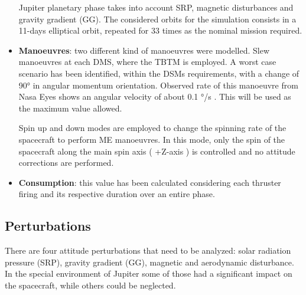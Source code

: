 \begin{itemize}
    Jupiter planetary phase takes into account SRP, magnetic disturbances and gravity gradient (GG). The considered orbits for the simulation consists in a 11-days elliptical orbit, repeated for 33 times as the nominal mission required. 

    \item \textbf{Manoeuvres}: two different kind of manoeuvres were modelled. Slew manoeuvres at each DMS, where the TBTM is employed. A worst case scenario has been identified, within the DSMs requirements, with a change of 90° in angular momentum orientation. Observed rate of this manoeuvre from Nasa Eyes\cite{nasa_eyes} shows an angular velocity of about 0.1 °/s \cite{slides_michele}. This will be used as the maximum value allowed. 
    
    Spin up and down modes are employed to change the spinning rate of the spacecraft to perform ME manoeuvres. In this mode, only the spin of the spacecraft along the main spin axis ( +Z-axis ) is controlled and no attitude corrections are performed.      

    \item \textbf{Consumption}: this value has been calculated considering each thruster firing and its respective duration over an entire phase. 

\end{itemize}

\subsection{Perturbations}
\label{subsec:perturbations}

There are four attitude perturbations that need to be analyzed: solar radiation pressure (SRP), gravity gradient (GG), magnetic and aerodynamic disturbance. In the special environment of Jupiter some of those had a significant impact on the spacecraft, while others could be neglected. 

